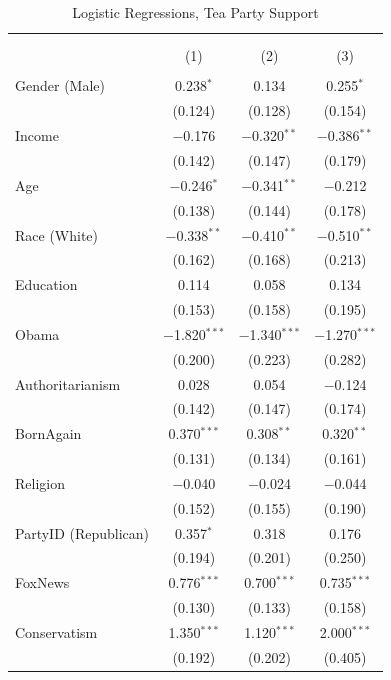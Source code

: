 \documentclass[12pt,]{article}
\begin{document}
\begin{table}[!htbp] \centering 
  \caption{Logistic Regressions, Tea Party Support} 
  \label{} 
\footnotesize 
\begin{tabular}{@{\extracolsep{5pt}}lccc} 
\\[-1.8ex]\hline 
\hline \\[-1.8ex] 
\\[-1.8ex] & (1) & (2) & (3)\\ 
\hline \\[-1.8ex] 
 Gender (Male) & 0.238$^{*}$ & 0.134 & 0.255$^{*}$ \\ 
  & (0.124) & (0.128) & (0.154) \\ 
  Income & $-$0.176 & $-$0.320$^{**}$ & $-$0.386$^{**}$ \\ 
  & (0.142) & (0.147) & (0.179) \\ 
  Age & $-$0.246$^{*}$ & $-$0.341$^{**}$ & $-$0.212 \\ 
  & (0.138) & (0.144) & (0.178) \\ 
  Race (White) & $-$0.338$^{**}$ & $-$0.410$^{**}$ & $-$0.510$^{**}$ \\ 
  & (0.162) & (0.168) & (0.213) \\ 
  Education & 0.114 & 0.058 & 0.134 \\ 
  & (0.153) & (0.158) & (0.195) \\ 
  Obama & $-$1.820$^{***}$ & $-$1.340$^{***}$ & $-$1.270$^{***}$ \\ 
  & (0.200) & (0.223) & (0.282) \\ 
  Authoritarianism & 0.028 & 0.054 & $-$0.124 \\ 
  & (0.142) & (0.147) & (0.174) \\ 
  BornAgain & 0.370$^{***}$ & 0.308$^{**}$ & 0.320$^{**}$ \\ 
  & (0.131) & (0.134) & (0.161) \\ 
  Religion & $-$0.040 & $-$0.024 & $-$0.044 \\ 
  & (0.152) & (0.155) & (0.190) \\ 
  PartyID (Republican) & 0.357$^{*}$ & 0.318 & 0.176 \\ 
  & (0.194) & (0.201) & (0.250) \\ 
  FoxNews & 0.776$^{***}$ & 0.700$^{***}$ & 0.735$^{***}$ \\ 
  & (0.130) & (0.133) & (0.158) \\ 
  Conservatism & 1.350$^{***}$ & 1.120$^{***}$ & 2.000$^{***}$ \\ 
  & (0.192) & (0.202) & (0.405) \\ 

\end{tabular}
\end{table}
\end{document}
